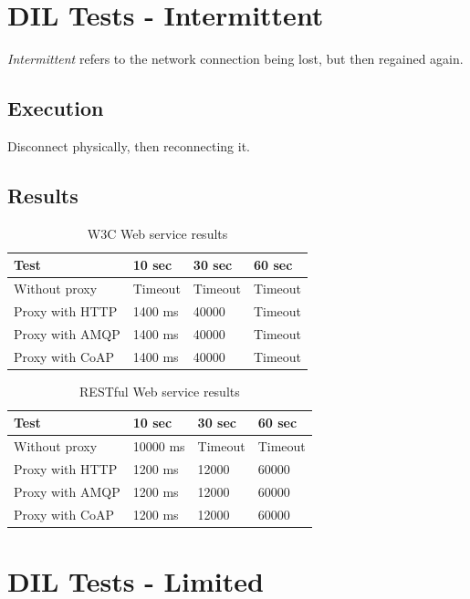\section{DIL Tests - Intermittent}

\textit{Intermittent} refers to the network connection being lost, but then regained again.

\subsection{Execution}

Disconnect physically, then reconnecting it.

\subsection{Results}

\begin{table}[h!]
\begin{tabular}{| l | l | l | l |}
\hline
  \textbf{Test} & \textbf{10 sec} & \textbf{30 sec} & \textbf{60 sec} \\ \hline
  Without proxy & Timeout & Timeout & Timeout \\ \hline
  Proxy with HTTP & 1400 ms & 40000 & Timeout \\ \hline
  Proxy with AMQP & 1400 ms & 40000 & Timeout \\ \hline
  Proxy with CoAP & 1400 ms & 40000 & Timeout \\ \hline
\end{tabular}
\caption{W3C Web service results}
\end{table}

\begin{table}[h!]
\begin{tabular}{| l | l | l | l |}
\hline
  \textbf{Test} & \textbf{10 sec} & \textbf{30 sec} & \textbf{60 sec} \\ \hline
  Without proxy & 10000 ms & Timeout & Timeout \\ \hline
  Proxy with HTTP & 1200 ms & 12000 & 60000 \\ \hline
  Proxy with AMQP & 1200 ms & 12000 & 60000 \\ \hline
  Proxy with CoAP & 1200 ms & 12000 & 60000 \\ \hline
\end{tabular}
\caption{RESTful Web service results}
\end{table}

\section{DIL Tests - Limited}

